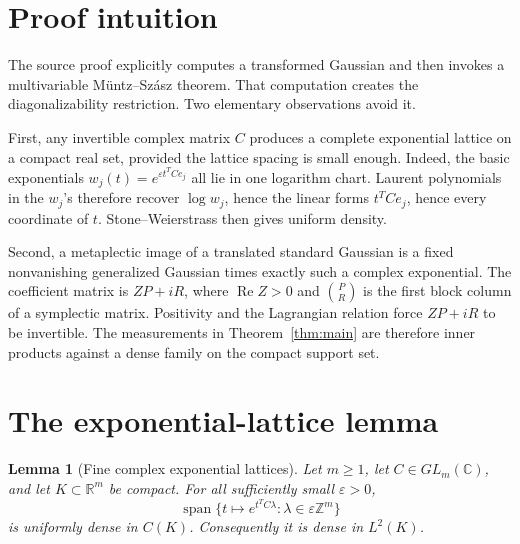 \documentclass[11pt]{article}
\newtheorem{lemma}[theorem]{Lemma}
\newcommand{\R}{\mathbb R}
\newcommand{\C}{\mathbb C}
\newcommand{\Z}{\mathbb Z}
\newcommand{\Rea}{\operatorname{Re}}
\newcommand{\spn}{\operatorname{span}}
\begin{document}
\section{Proof intuition}

The source proof explicitly computes a transformed Gaussian and then invokes a
multivariable M\"untz--Sz\'asz theorem.  That computation creates the
diagonalizability restriction.  Two elementary observations avoid it.

First, any invertible complex matrix \(C\) produces a complete exponential
lattice on a compact real set, provided the lattice spacing is small enough.
Indeed, the basic exponentials
\(w_j(t)=e^{\varepsilon t^TCe_j}\) all lie in one logarithm chart.  Laurent
polynomials in the \(w_j\)'s therefore recover \(\log w_j\), hence the linear
forms \(t^TCe_j\), hence every coordinate of \(t\).  Stone--Weierstrass then
gives uniform density.

Second, a metaplectic image of a translated standard Gaussian is a fixed
nonvanishing generalized Gaussian times exactly such a complex exponential.
The coefficient matrix is \(ZP+iR\), where \(\Rea Z>0\) and
\(\binom PR\) is the first block column of a symplectic matrix.  Positivity and
the Lagrangian relation force \(ZP+iR\) to be invertible.  The measurements in
Theorem~\ref{thm:main} are therefore inner products against a dense family on
the compact support set.

\section{The exponential-lattice lemma}

\begin{lemma}[Fine complex exponential lattices]\label{lem:exponential}
Let \(m\ge1\), let \(C\in GL_m(\C)\), and let \(K\subset\R^m\) be
compact.  For all sufficiently small \(\varepsilon>0\),
\[
 \spn\{t\mapsto e^{t^TC\lambda}:\lambda\in\varepsilon\Z^m\}
\]
is uniformly dense in \(C(K)\).  Consequently it is dense in \(L^2(K)\).
\end{lemma}
\end{document}
